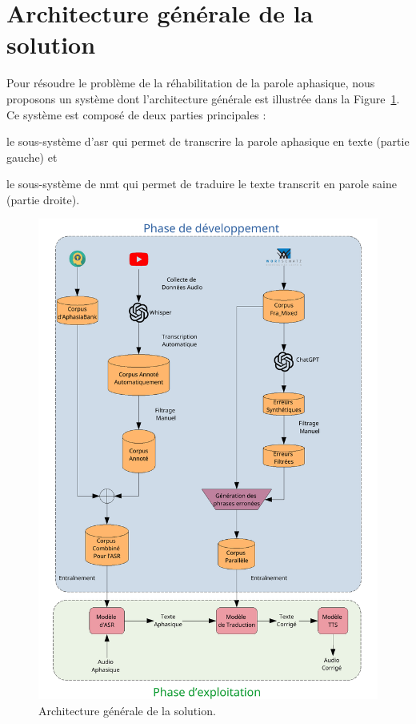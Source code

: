 \section{Architecture générale de la solution}%
\label{sec.conception.archi}

Pour résoudre le problème de la réhabilitation de la parole aphasique,
nous proposons un système dont l'architecture générale est illustrée dans la Figure~\ref{fig.archi}.
Ce système est composé de deux parties principales :
\begin{enumerate*}[label=(\alph*)]
    \item le sous-système d'\gls{asr} qui permet de transcrire la parole aphasique en texte
    (partie gauche) et
    \item le sous-système de \gls{nmt} qui permet de traduire le texte transcrit en parole saine
    (partie droite).
\end{enumerate*}

\begin{figure}[hbt]
    \begin{center}
        \includegraphics[width=.7\textwidth]{assets/pdf/archutecture.pdf}
    \end{center}
    \caption{Architecture générale de la solution.}
    \label{fig.archi}
\end{figure}

